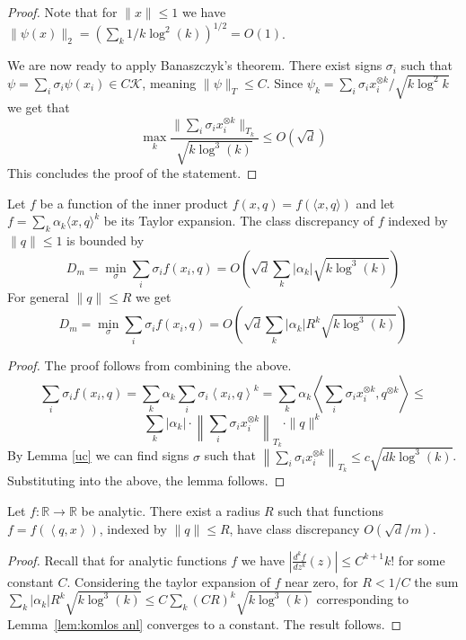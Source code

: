\documentclass[12pt]{colt2019} %
\newcommand{\ip}[1]{\left \langle #1 \right \rangle}
\newcommand{\R}{\mathbb{R}}
\begin{document}
{\begin{proof}
\noindent Note that for $\|x\| \le 1$ we have $\|\psi(x)\|_2 = (\sum_k  1/k\log^2(k))^{1/2} = O(1)$.


We are now ready to apply Banaszczyk's theorem. 
There exist signs $\sigma_i$ such that $\psi  = \sum_i \sigma_i \psi(x_i) \in C \mathcal K$, meaning $\|\psi\|_T \leq C$.
Since $\psi_k = \sum_i \sigma_i x_i^{\otimes k}/\sqrt{k \log^2{k}}$ we get that 
$$\max_k \frac{\|\sum_i \sigma_i  x_i^{\otimes k}\|_{T_k}}{\sqrt{k \log^{3}(k)}} \le O\left( \sqrt{d} \right)$$
This concludes the proof of the statement.
\end{proof}

\begin{lemma} \label{lem:komlos anl}
Let $f$ be a function of the inner product $f(x,q) = f(\langle x,q\rangle)$ and let $f = \sum_k \alpha_k \langle x,q\rangle^k$ be its Taylor expansion. 
The class discrepancy of $f$ indexed by $\|q\| \leq 1$ is bounded by
\[
D_m = \min_\sigma \sum_i \sigma_i f(x_i,q) =O\left( \sqrt{d} \sum_k  |\alpha_k|\sqrt{k\log^3(k)}\right)
\]
For general $\|q\| \leq R$ we get
\[
D_m = \min_\sigma \sum_i \sigma_i f(x_i,q) =O\left( \sqrt{d} \sum_k  |\alpha_k| R^k \sqrt{ k\log^3(k)}\right)
\]
\end{lemma}
\begin{proof}
The proof follows from combining the above.
$$
\sum_i \sigma_i f(x_i,q) = \sum_k \alpha_k \sum_i \sigma_i \ip{ x_i,q}^k =  \sum_k \alpha_k  \ip{  \sum_i \sigma_i x_i^{\otimes k},q^{\otimes k}} \le $$
$$\sum_k |\alpha_k| \cdot \left\| \sum_i \sigma_i x_i^{\otimes k}\right\|_{T_k} \cdot \|q\|^k
$$
By Lemma \ref{uc} we can find signs $\sigma$ such that 
$\left\| \sum_i \sigma_i x_i^{\otimes k}\right\|_{T_k} \le c\sqrt{d k \log^3(k)}$. Substituting into the above, the lemma follows.
\end{proof}

\begin{theorem}\label{analitic1}
Let $f:\R\rightarrow\R$ be analytic. There exist a radius $R$ such that functions $f = f(\ip{q,x})$, indexed by $\|q\| \leq R$, have class discrepancy $O(\sqrt{d}/m)$. 
\end{theorem}
\begin{proof}
Recall that for analytic functions $f$ we have $\left| \frac{d^k f}{dz^k}(z) \right|  \leq C^{k+1} k! $
for some constant $C$. Considering the taylor expansion of $f$ near zero, for $R < 1/C$ the sum
$ \sum_k  |\alpha_k| R^k \sqrt{ k\log^3(k)} \leq C \sum_k  (CR)^k \sqrt{ k\log^3(k)}$
corresponding to Lemma~\ref{lem:komlos anl} converges to a constant. The result follows.
\end{proof}

}
\end{document}
